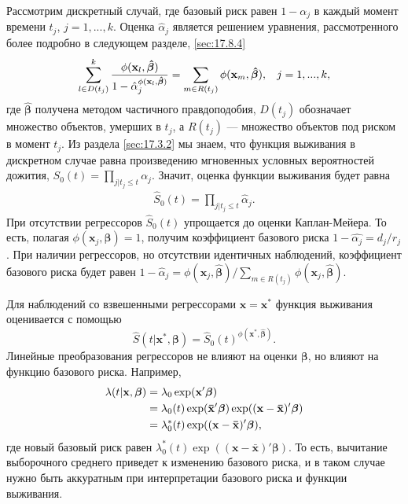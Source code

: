 Рассмотрим дискретный случай, где базовый риск равен $1-\alpha_j$ в каждый момент времени $t_j$, $j=1,...,k$. Оценка $\hat{\alpha}_j$ является решением уравнения, рассмотренного более подробно в следующем разделе, \ref{sec:17.8.4}
        \begin{align}
        \label{eq:17.36}
        \sum^{k}_{l\in D(t_j)}\frac{\phi(\mathbf{x}_l,\bm{\hat{\beta}})}{1-\hat{\alpha}_j^{\phi(\mathbf{x}_l,\bm{\hat{\beta}})}}=\sum_{m\in R(t_j)}\phi(\mathbf{x}_m,\bm{\hat{\beta}}),\hspace{0.3cm}j=1,...,k,
        \end{align}
где $\bm{\hat{\beta}}$ получена методом частичного правдоподобия, $D(t_j)$ обозначает множество объектов, умерших в $t_j$, а $R(t_j)$ --- множество объектов под риском в момент $t_j$. Из раздела \ref{sec:17.3.2} %
мы знаем, что функция выживания в дискретном случае равна произведению мгновенных условных вероятностей дожития, $S_0(t)=\prod_{j|t_j\le t}\alpha_j$. Значит, оценка функции выживания будет равна
        \begin{align}
        \label{eq:17.37}
        \hat{S}_0(t)=\prod_{j|t_j\le t}\hat{\alpha}_j.
        \end{align}
При отсутствии регрессоров $\hat{S}_0(t)$ упрощается до оценки Каплан-Мейера. То есть, полагая $\phi(\mathbf{x}_j,\bm{\beta})=1$, получим коэффициент базового риска $1-\hat{\alpha_j}=d_j/r_j$. При наличии регрессоров, но отсутствии идентичных наблюдений, коэффициент базового риска будет равен $1-\hat{\alpha}_j=\phi(\mathbf{x}_j,\bm{\hat{\beta}})/\sum_{m\in R(t_j)}\phi(\mathbf{x}_j,\bm{\hat{\beta}})$.

Для наблюдений со взвешенными регрессорами $\mathbf{x}=\mathbf{x}^*$ функция выживания оценивается с помощью
        $$\hat{S}(t|\mathbf{x}^*,\bm{\beta})=\hat{S}_0(t)^{\phi(\mathbf{x}^*,\hat{\bm{\beta}})}.$$
Линейные преобразования регрессоров не влияют на оценки $\bm{\beta}$, но влияют на функцию базового риска. Например,
        \begin{align}
        \lambda(t|\mathbf{x},\bm{\beta})&=\lambda_0\exp(\mathbf{x}'\bm{\beta})\notag\\
        &=\lambda_0(t)\exp(\mathbf{\bar{x}}'\bm{\beta})\exp((\mathbf{x}-\mathbf{\bar{x}})'\bm{\beta})\notag\\
        &=\lambda^*_0(t)\exp((\mathbf{x}-\mathbf{\bar{x}})'\bm{\beta}),\notag
        \end{align}
где новый базовый риск равен $\lambda^*_0(t)\exp((\mathbf{x}-\mathbf{\bar{x}})'\bm{\beta})$. %
То есть, вычитание выборочного среднего приведет к изменению базового риска, и в таком случае нужно быть аккуратным при интерпретации базового риска и функции выживания.

